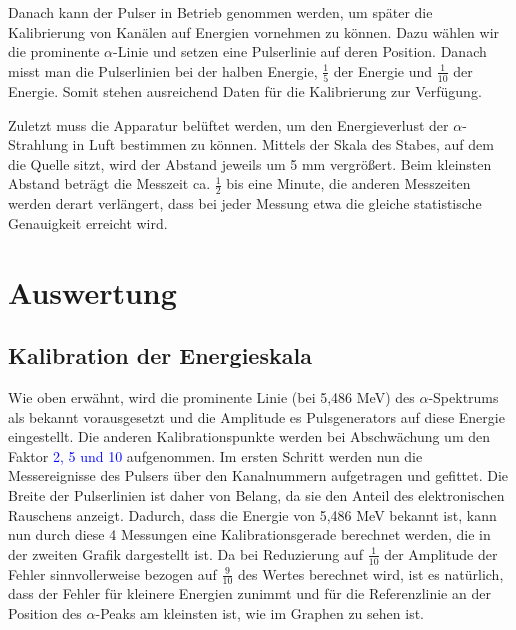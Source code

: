 \documentclass[bigchapter,colorback,accentcolor=tud4b,linedtoc,11pt]{tudreport}
\begin{document}
Danach kann der Pulser in Betrieb genommen werden, um später die Kalibrierung von Kanälen auf Energien vornehmen zu können. Dazu wählen wir die prominente $\alpha$-Linie und setzen eine Pulserlinie auf deren Position. Danach misst man die Pulserlinien bei der halben Energie, $\frac{1}{5}$ der Energie und $\frac{1}{10}$ der Energie. Somit stehen ausreichend Daten für die Kalibrierung zur Verfügung. 

Zuletzt muss die Apparatur belüftet werden, um den Energieverlust der $\alpha$-Strahlung in Luft bestimmen zu können. Mittels der Skala des Stabes, auf dem die Quelle sitzt, wird der Abstand jeweils um 5 mm vergrößert. Beim kleinsten Abstand beträgt die Messzeit ca. $\frac{1}{2}$ bis eine Minute, die anderen Messzeiten werden derart verlängert, dass bei jeder Messung etwa die gleiche statistische Genauigkeit erreicht wird. 

\chapter{Auswertung}

\section{Kalibration der Energieskala}

Wie oben erwähnt, wird die prominente Linie (bei 5,486 MeV) des
$\alpha$-Spektrums als bekannt vorausgesetzt und die Amplitude es Pulsgenerators
auf diese Energie eingestellt. Die anderen Kalibrationspunkte werden bei
Abschwächung um den Faktor \textcolor{blue}{2, 5 und 10} aufgenommen. Im ersten Schritt werden nun die
Messereignisse des Pulsers über den Kanalnummern aufgetragen und gefittet. Die
Breite der Pulserlinien ist daher von Belang, da sie den Anteil des
elektronischen Rauschens anzeigt. Dadurch, dass die Energie von 5,486 MeV
bekannt ist, kann nun durch diese 4 Messungen eine Kalibrationsgerade berechnet
werden, die in der zweiten Grafik dargestellt ist. Da bei Reduzierung auf
$\frac{1}{10}$ der Amplitude der Fehler sinnvollerweise bezogen auf
$\frac{9}{10}$ des Wertes berechnet wird, ist es natürlich, dass der Fehler für
kleinere Energien zunimmt und für die Referenzlinie an der Position des $\alpha$-Peaks am kleinsten ist, wie im Graphen zu sehen ist. 


\end{document}
